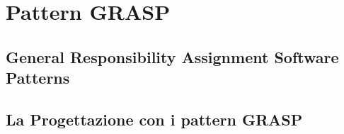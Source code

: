 \chapter{Pattern GRASP}

\section{General Responsibility Assignment Software Patterns}

\section{La Progettazione con i pattern GRASP}